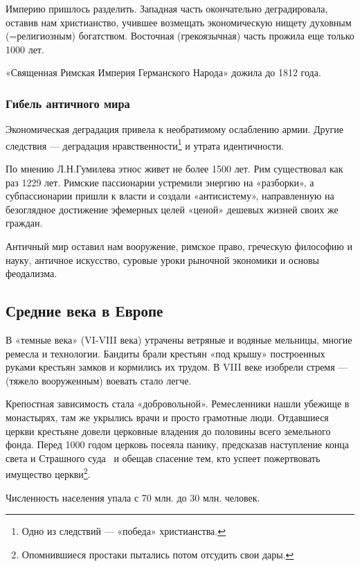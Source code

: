 Империю пришлось разделить. Западная часть окончательно деградировала, оставив нам христианство, учившее возмещать
экономическую нищету духовным (=религиозным) богатством. Восточная (грекоязычная) часть прожила еще только 1000 лет.


«Священная Римская Империя Германского Народа» дожила до 1812 года.

\subsubsection[Гибель античного мира]{Гибель античного мира}

Экономическая деградация привела к необратимому ослаблению армии. Другие следствия — деградация
нравственности\footnote{Одно из следствий — «победа» христианства.} и утрата идентичности.


По мнению Л.Н.Гумилева этнос живет не более 1500 лет. Рим существовал как раз 1229 лет. Римские пассионарии устремили
энергию на «разборки», а субпассионарии пришли к власти и создали «антисистему», направленную на безоглядное достижение
эфемерных целей «ценой» дешевых жизней своих же граждан.


Античный мир оставил нам вооружение, римское право, греческую философию и науку, античное искусство, суровые уроки
рыночной экономики и основы феодализма.

\subsection[Средние века в Европе]{Средние века в Европе}

В «темные века» (\foreignlanguage{english}{VI}{}-\foreignlanguage{english}{VIII} века) утрачены ветряные и водяные
мельницы, многие ремесла и технологии. Бандиты брали крестьян «под крышу» построенных руками крестьян замков и
кормились их трудом. В \foreignlanguage{english}{VIII} веке изобрели стремя — (тяжело вооруженным) воевать стало легче.


Крепостная зависимость стала «добровольной». Ремесленники нашли убежище в монастырях, там же укрылись врачи и просто
грамотные люди. Отдавшиеся церкви крестьяне довели церковные владения до половины всего земельного фонда. Перед 1000
годом церковь посеяла панику, предсказав наступление конца света и Страшного суда \ и обещав спасение тем, кто успеет
пожертвовать имущество церкви\footnote{Опомнившиеся простаки пытались потом отсудить свои дары.}.


Численность населения упала с 70 млн. до 30 млн. человек.


